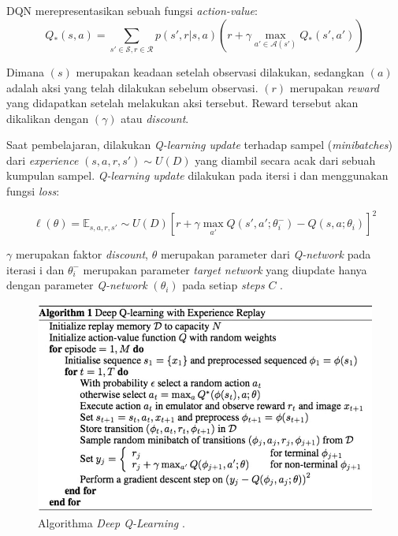 DQN merepresentasikan sebuah fungsi \emph{action-value}:
\begin{equation}
  Q_*(s,a) = \sum_{s' \in \mathcal{S}, r\in\mathcal{R}}p(s',r|s,a)(r + \gamma \max_{a'\in\mathcal{A}(s')}Q_*(s',a'))
  \label{Eq:DQNEquation}
\end{equation}

Dimana $(s)$ merupakan keadaan setelah observasi dilakukan, sedangkan $(a)$ adalah aksi yang telah dilakukan sebelum observasi.
$(r)$ merupakan \emph{reward} yang didapatkan setelah melakukan aksi tersebut. Reward tersebut akan dikalikan dengan $(\gamma)$ atau \emph{discount}.

Saat pembelajaran, dilakukan \emph{Q-learning update} terhadap sampel (\emph{minibatches}) dari \emph{experience} $(s,a,r,s') \sim U(D)$
yang diambil secara acak dari sebuah kumpulan sampel. \emph{Q-learning update} dilakukan pada itersi i dan menggunakan fungsi \emph{loss}:

\begin{equation}
	\ell (\theta) = \mathbb E _{s, a, r, s'} \sim U(D) \left[r + 
    \gamma \max _{a'} Q (s', a';\theta^{-}_{i}) 
    - Q(s, a;\theta_{i})\right]^2
    \label{Eq:DQNLossFunction}
\end{equation}

$\gamma$ merupakan faktor \emph{discount}, $\theta$ merupakan parameter dari \emph{Q-network} pada iterasi i 
dan $\theta^{-}_{i}$ merupakan parameter \emph{target network} yang diupdate hanya dengan 
parameter \emph{Q-network} $(\theta_{i})$ pada setiap \emph{steps} $C$ \citep{deepQN}.

\begin{figure}[H]
  \centering
    \includegraphics[scale=0.4]{gambar/dqn_algorithm.png}
    \caption{Algorithma \emph{Deep Q-Learning} \citep{deepQN}.}
    \label{fig:dqnAlgorithm}
\end{figure}

